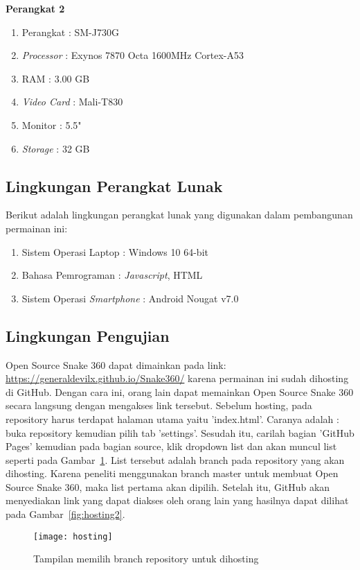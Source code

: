 \textbf{Perangkat 2}
\begin{enumerate}
	\item Perangkat : SM-J730G
	\item \textit{Processor} : Exynos 7870 Octa 1600MHz Cortex-A53
	\item RAM : 3.00 GB
	\item \textit{Video Card} : Mali-T830
	\item Monitor : 5.5"
	\item \textit{Storage} : 32 GB
\end{enumerate}

\subsection{Lingkungan Perangkat Lunak}
Berikut adalah lingkungan perangkat lunak yang digunakan dalam pembangunan permainan ini:

\begin{enumerate}
	\item Sistem Operasi Laptop : Windows 10 64-bit
	\item Bahasa Pemrograman : \textit{Javascript}, HTML
	\item Sistem Operasi \textit{Smartphone} : Android Nougat v7.0
\end{enumerate}

\subsection{Lingkungan Pengujian}
Open Source Snake 360 dapat dimainkan pada link: \url{https://generaldevilx.github.io/Snake360/} karena permainan ini sudah dihosting di GitHub. Dengan cara ini, orang lain dapat memainkan Open Source Snake 360 secara langsung dengan mengakses link tersebut. Sebelum hosting, pada repository harus terdapat halaman utama yaitu 'index.html'. Caranya adalah : buka repository kemudian pilih tab 'settings'. Sesudah itu, carilah bagian 'GitHub Pages' kemudian pada bagian source, klik dropdown list dan akan muncul list seperti pada Gambar~\ref{fig:hosting}. List tersebut adalah branch pada repository yang akan dihosting. Karena peneliti menggunakan branch master untuk membuat Open Source Snake 360, maka list pertama akan dipilih. Setelah itu, GitHub akan menyediakan link yang dapat diakses oleh orang lain yang hasilnya dapat dilihat pada Gambar~\ref{fig:hosting2}.

\begin{figure}[H]
	\centering  
	\texttt{[image: hosting]}  
	\caption[Tampilan memilih branch repository untuk dihosting]{Tampilan memilih branch repository untuk dihosting}
	\label{fig:hosting} 
\end{figure}

